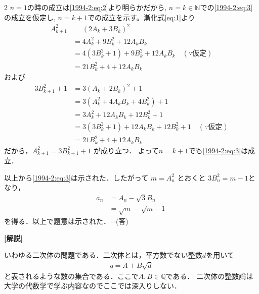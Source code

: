 \documentclass[../../main.tex]{subfiles}
\begin{document}
\begin{multicols}{2}
  $n=1$の時の成立は\cref{1994-2:eq:2}より明らかだから, $n=k \in \mathbb{N}$での\cref{1994-2:eq:3}の成立を仮定し, $n=k+1$での成立を示す。漸化式\cref{eq:1}より
  \begin{align*}
    A_{k+1}^2
     & = (2A_k + 3B_k)^2                                      \\
     & = 4A_k^2 + 9B_k^2 + 12A_kB_k                           \\
     & = 4(3B_k^2 + 1) + 9B_k^2 + 12A_kB_k \quad (\text{∵仮定}) \\
     & = 21B_k^2 + 4 + 12A_kB_k
  \end{align*}
  および
  \begin{align*}
    3B_{k+1}^2 + 1
     & = 3(A_k + 2B_k)^2 + 1                                       \\
     & = 3(A_k^2 + 4A_kB_k + 4B_k^2) + 1                           \\
     & = 3A_k^2 + 12A_kB_k + 12B_k^2 + 1                           \\
     & = 3(3B_k^2 + 1) + 12A_kB_k + 12B_k^2 + 1 \quad (\text{∵仮定}) \\
     & = 21B_k^2 + 4 + 12A_kB_k
  \end{align*}
  だから，$A_{k+1}^2 = 3B_{k+1}^2 + 1$ が成り立つ．
  よって$n=k+1$でも\cref{1994-2:eq:3}は成立．

  以上から\cref{1994-2:eq:3}は示された．したがって
  $m=A_n^2$ とおくと $3B_n^2 = m-1$となり，
  \begin{align*}
    a_n
     & = A_n - \sqrt{3} B_n    \\
     & = \sqrt{m} - \sqrt{m-1}
  \end{align*}
  を得る．以上で題意は示された．$\cdots$(答)

  \vspace{10pt}
  {\bf[解説]}

  いわゆる二次体の問題である．二次体とは，平方数でない整数$d$を用いて
  \begin{align*}
    q = A + B\sqrt{d}
  \end{align*}
  と表されるような数の集合である．ここで$A,B \in \mathbb{Q}$である．
  二次体の整数論は大学の代数学で学ぶ内容なのでここでは深入りしない．


\end{multicols}
\end{document}
